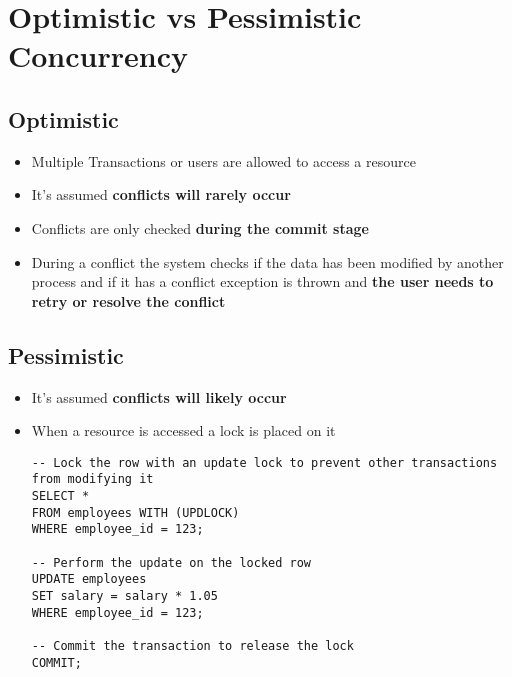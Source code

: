\chapter{Optimistic vs Pessimistic Concurrency}

\section{Optimistic}
\begin{itemize}
	\item Multiple Transactions or users are allowed to access a resource
	\item It's assumed \textbf{conflicts will rarely occur}
	\item Conflicts are only checked \textbf{during the commit stage}
	\item During a conflict the system checks if the data has been modified by another process 
	and if it has a conflict exception is thrown and \textbf{the user needs to retry or resolve the conflict}
\end{itemize}

\section{Pessimistic}
\begin{itemize}
	\item It's assumed \textbf{conflicts will likely occur}
	\item When a resource is accessed a lock is placed on it
	
		\begin{lstlisting}[style=Sql]
-- Lock the row with an update lock to prevent other transactions from modifying it
SELECT *
FROM employees WITH (UPDLOCK)
WHERE employee_id = 123;

-- Perform the update on the locked row
UPDATE employees
SET salary = salary * 1.05
WHERE employee_id = 123;

-- Commit the transaction to release the lock
COMMIT;
		\end{lstlisting}
\end{itemize}